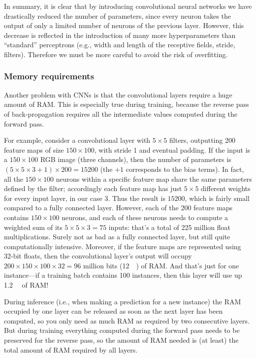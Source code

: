 In summary, it is clear that by introducing convolutional neural networks we have drastically reduced the number of parameters, since every neuron takes the output of only a limited number of neurons of the previous layer. However, this decrease is reflected in the introduction of many more hyperparameters than ``standard'' perceptrons (e.g., width and length of the receptive fields, stride, filters). Therefore we must be more careful to avoid the risk of overfitting.
\subsubsection{Memory requirements}
Another problem with CNNs is that the convolutional layers require a huge amount of RAM. This is especially true during training, because the reverse pass of back-propagation requires all the intermediate values computed during the forward pass.

For example, consider a convolutional layer with $5\times5$ filters, outputting 200 feature maps of size $150\times100$, with stride 1 and eventual padding. If the input is a $150\times100$ RGB image (three channels), then the number of parameters is $(5\times5\times3+1)\times200=\num{15200}$ (the $+1$ corresponds to the bias terms). In fact, all the $150\times100$ neurons within a specific feature map share the same parameters defined by the filter; accordingly each feature map has just $5\times5$ different weights for every input layer, in our case 3. Thus the result is $\num{15200}$, which is fairly small compared to a fully connected layer. However, each of the 200 feature maps contains $150\times100$ neurons, and each of these neurons needs to compute a weighted sum of its $5\times5\times3=75$ inputs: that's a total of 225 million float multiplications. Surely not as bad as a fully connected layer, but still quite computationally intensive. Moreover, if the feature maps are represented using 32-bit floats, then the convolutional layer's output will occupy $200\times150\times100\times32=96$ million bits (\SI{12}{\mega\byte}) of RAM. And that's just for one instance—if a training batch contains 100 instances, then this layer will use up \SI{1.2}{\giga\byte} of RAM!

During inference (i.e., when making a prediction for a new instance) the RAM occupied by one layer can be released as soon as the next layer has been computed, so you only need as much RAM as required by two consecutive layers. But during training everything computed during the forward pass needs to be preserved for the reverse pass, so the amount of RAM needed is (at least) the total amount of RAM required by all layers.

